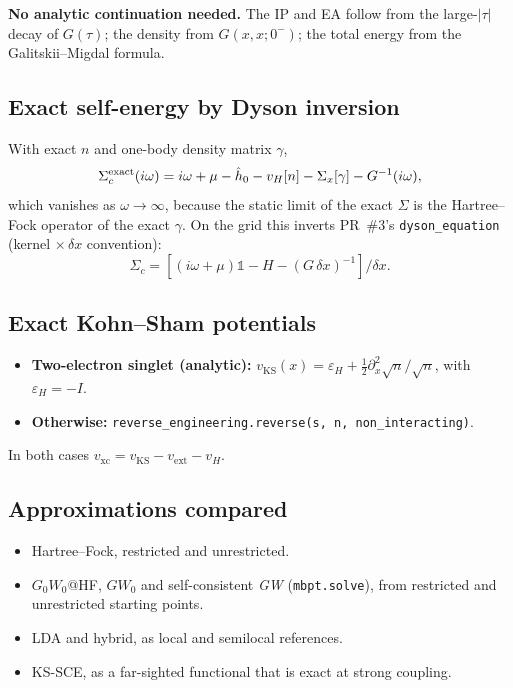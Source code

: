 \documentclass[11pt,a4paper]{article}
\newcommand{\GW}{\textit{GW}}
\newcommand{\vxc}{v_\mathrm{xc}}
\newcommand{\code}[1]{\texttt{#1}}
\begin{document}
\textbf{No analytic continuation needed.} The IP and EA follow from the large-$|\tau|$ decay of $G(\tau)$; the density from $G(x,x;0^-)$; the total energy from the Galitskii--Migdal formula.

\subsection{Exact self-energy by Dyson inversion}
With exact $n$ and one-body density matrix $\gamma$,
\begin{equation}
\Sigma_c^{\rm exact}(i\omega)=i\omega+\mu-\hat h_0-v_H[n]-\Sigma_x[\gamma]-G^{-1}(i\omega),
\end{equation}
which vanishes as $\omega\to\infty$, because the static limit of the exact $\Sigma$ is the Hartree--Fock operator of the exact $\gamma$. On the grid this inverts PR~\#3's \code{dyson\_equation} (kernel $\times\,\delta x$ convention):
\begin{equation}
\Sigma_c=[(i\omega+\mu)\mathbb{1}-H-(G\,\delta x)^{-1}]/\delta x .
\end{equation}

\subsection{Exact Kohn--Sham potentials}
\begin{itemize}
\item \textbf{Two-electron singlet (analytic):} $v_\mathrm{KS}(x)=\varepsilon_H+\tfrac12\partial_x^2\sqrt{n}/\sqrt{n}$, with $\varepsilon_H=-I$.
\item \textbf{Otherwise:} \code{reverse\_engineering.reverse(s, n, non\_interacting)}.
\end{itemize}
In both cases $\vxc=v_\mathrm{KS}-v_\mathrm{ext}-v_H$.

\subsection{Approximations compared}
\begin{itemize}
\item Hartree--Fock, restricted and unrestricted.
\item $G_0W_0$@HF, $GW_0$ and self-consistent \GW{} (\code{mbpt.solve}), from restricted and unrestricted starting points.
\item LDA and hybrid, as local and semilocal references.
\item KS-SCE, as a far-sighted functional that is exact at strong coupling.
\end{itemize}
\end{document}
